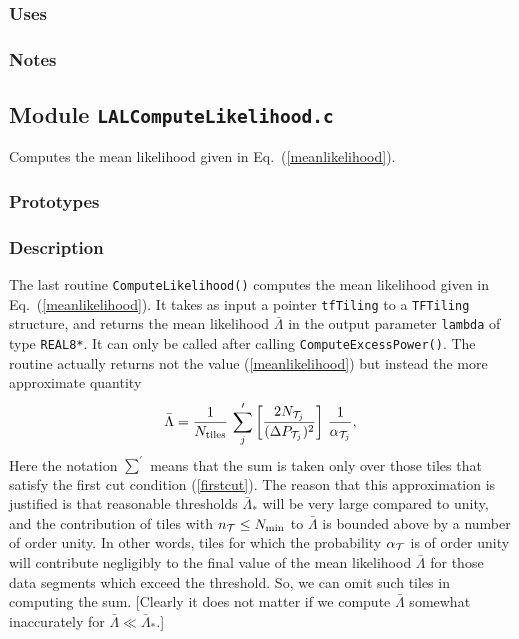 \subsubsection*{Uses}

\subsubsection*{Notes}

\vfill{\footnotesize}

\newpage
\subsection{Module \texttt{LALComputeLikelihood.c}}
\label{ss:LALComputeLikelihood.c}

Computes the mean likelihood given in Eq.\ (\ref{meanlikelihood}).

\subsubsection*{Prototypes}
\vspace{0.1in}


\subsubsection*{Description}

The last routine \verb+ComputeLikelihood()+ computes the mean likelihood given
in Eq.\ (\ref{meanlikelihood}).  It takes as input a pointer \verb+tfTiling+
to a \verb+TFTiling+ structure, and returns the mean likelihood ${\bar
\Lambda}$ in the output parameter \verb+lambda+ of type \verb+REAL8*+.  It can
only be called after calling \verb+ComputeExcessPower()+.  The routine
actually returns not the value (\ref{meanlikelihood}) but instead the more
approximate quantity  
\begin{equation}
{\bar \Lambda} = {1 \over N_{\rm tiles}} \, \sum_j^\prime \left[{2 N_{{\cal
T}_j} \over (\Delta P_{{\cal T}_j})^2 } \right] \, {1 \over
\alpha_{{\cal T}_j}},
\label{meanlikelihood1}
\end{equation}
Here the notation $\sum^\prime$ means that the sum is taken only over those
tiles that satisfy the first cut condition (\ref{firstcut}).  The reason that
this approximation is justified is that reasonable thresholds ${\bar
\Lambda}_*$ will be very large compared to unity, and the contribution of
tiles with $n_{\cal T} \le N_{\rm min}$ to ${\bar \Lambda}$ is bounded above
by a number of order unity.  In other words, tiles for which the probability
$\alpha_{\cal T}$ is of order unity will contribute negligibly to the final
value of the mean likelihood ${\bar \Lambda}$ for those data segments which
exceed the threshold.  So, we can omit such tiles in computing the sum.
[Clearly it does not matter if we compute ${\bar \Lambda}$ somewhat
inaccurately for ${\bar \Lambda} \ll {\bar \Lambda}_*$.] 

